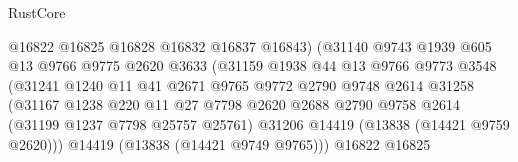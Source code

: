 \begin{lexlean}{RustCore}
\begin{coremodule}
                                        @16822
                                        @16825
                                        @16828
                                        @16832
                                        @16837
                                        @16843)
                                      (@31140
                                        @9743
                                        @1939
                                        @605
                                        @13
                                        @9766
                                        @9775
                                        @2620
                                        @3633
                                        (@31159
                                          @1938
                                          @44
                                          @13
                                          @9766
                                          @9773
                                          @3548
                                          (@31241
                                            @1240
                                            @11
                                            @41
                                            @2671
                                            @9765
                                            @9772
                                            @2790
                                            @9748
                                            @2614
                                            @31258
                                            (@31167
                                              @1238
                                              @220
                                              @11
                                              @27
                                              @7798
                                              @2620
                                              @2688
                                              @2790
                                              @9758
                                              @2614
                                              (@31199 @1237 @7798 @25757 @25761)
                                              @31206
                                              @14419
                                              (@13838 (@14421 @9759 @2620)))
                                            @14419
                                            (@13838 (@14421 @9749 @9765)))
                                          @16822
                                          @16825

\end{coremodule}
\end{lexlean}
